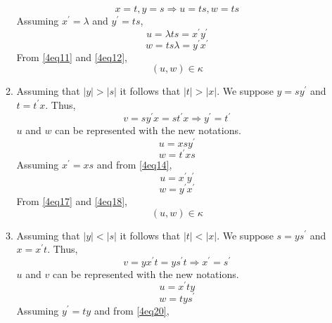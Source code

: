 \begin{itemize}
\begin{enumerate}
\begin{equation}
x = t, y = s \Rightarrow u = ts, w = ts
\end{equation}
Assuming $x^\prime = \lambda$ and $y^\prime = ts$,
\begin{equation} \label{4eq11}
u = \lambda ts = x^\prime y^\prime
\end{equation}
\begin{equation} \label{4eq12}
w = ts \lambda = y^\prime x^\prime
\end{equation}
From \eqref{4eq11} and \eqref{4eq12},
\begin{equation}\label{4eq13}
\left( u,w \right) \in \kappa
\end{equation}
\item Assuming that $|y| > |s|$ it follows that $|t| > |x|$. We suppose $y = sy^\prime$ and $t = t^\prime x$. Thus,
\begin{equation}\label{4eq14}
v = sy^\prime x = st^\prime x \Rightarrow y^\prime = t^\prime
\end{equation}
$u$ and $w$ can be represented with the new notations.
\begin{equation}
u = xsy^\prime
\end{equation}
\begin{equation}
w = t^\prime xs
\end{equation}
Assuming $x^\prime = xs$ and from \eqref{4eq14},
\begin{equation}\label{4eq17}
u = x^\prime y^\prime
\end{equation}
\begin{equation}\label{4eq18}
w = y^\prime x^\prime
\end{equation}
From \eqref{4eq17} and \eqref{4eq18},
\begin{equation}\label{4eq19}
\left(u,w \right) \in \kappa
\end{equation}
\item Assuming that $|y| < |s|$ it follows that $|t| < |x|$. We suppose $s = ys^\prime$ and $x = x^\prime t$. Thus,
\begin{equation} \label{4eq20}
v = yx^\prime t = ys^\prime t \Rightarrow x^\prime = s^\prime
\end{equation}
$u$ and $v$ can be represented with the new notations.
\begin{equation}
u = x^\prime ty
\end{equation}
\begin{equation}
w = ty s^\prime
\end{equation}
Assuming $y^\prime = ty$ and from \eqref{4eq20},

\end{enumerate}
\end{itemize}
